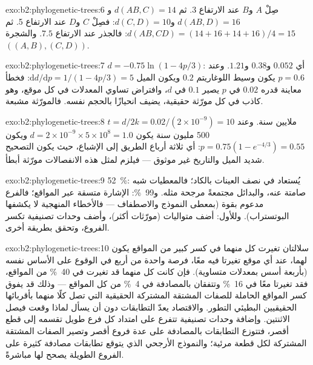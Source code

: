 \begin{solution}{exo:b2:phylogenetic-trees:6}
صِلْ $A$ و$B$ عند الارتفاع 3. ثم $d(AB,C) = 14$ و$d(AB,D) = 16$
و$d(C,D) = 10$: فصِلْ $C$ و$D$ عند الارتفاع 5. ثم $d(AB,CD) = (14 + 16
+ 14 + 16)/4 = 15$: فالجذر عند الارتفاع $7.5$. والشجرة $((A,B),(C,D))$.
\end{solution}

\begin{solution}{exo:b2:phylogenetic-trees:7}
$d = -0.75\ln(1 - 4p/3)$: أي $0.052$ و$0.38$ و$1.21$. وعند $p = 0.6$ يكون
وسيط اللوغاريتم $0.2$ ويكون الميل $\mathrm{d}d/\mathrm{d}p
= 1/(1 - 4p/3) = 5$: فخطأ معاينة قدره $0.02$ في $p$ يصير
$0.1$ في $d$، وافتراض تساوي المعدلات في كل موقع،
وهو كاذب في كل مورّثة حقيقية، يضيف انحيازًا بالحجم نفسه. فالمورّثة
مشبعة.
\end{solution}

\begin{solution}{exo:b2:phylogenetic-trees:8}
$t = d/2k = 0.02/(2\times 10^{-9}) = 10$ ملايين سنة. وعند 500
مليون سنة يكون $d = 2\times 10^{-9}\times 5\times 10^{8} = 1.0$ ويكون
$p = 0.75(1 - e^{-4/3}) = 0.55$: أي ثلاثة أرباع الطريق إلى
الإشباع، حيث يكون التصحيح شديد الميل والتاريخ غير موثوق
--- فيلزم لمثل هذه الانفصالات مورّثة أبطأ.
\end{solution}

\begin{solution}{exo:b2:phylogenetic-trees:9}
\qty{52}{\%}: يُستعاد  في نصف العينات بالكاد؛
فالمعطيات شبه صامتة عنه، والبدائل مجتمعةً
مرجحة مثله. و\qty{99}{\%}: الإشارة متسقة عبر
المواقع؛ فالفرع مدعوم بقوة (بمعطى النموذج
والاصطفاف --- فالأخطاء المنهجية 
لا يكشفها البوتستراب). وللأول: أضف متواليات (مورّثات
أكثر)، وأضف وحدات تصنيفية تكسر الفروع، وتحقق بطريقة أخرى.
\end{solution}

\begin{solution}{exo:b2:phylogenetic-trees:10}
سلالتان تغيرت كل منهما في كسر كبير من المواقع
يكون لهما، عند أي موقع تغيرتا فيه معًا، فرصة واحدة من أربع
في الوقوع على الأساس نفسه (بأربعة أسس بمعدلات متساوية). فإن كانت كل
منهما قد تغيرت في \qty{40}{\%} من المواقع، فقد تغيرتا معًا في
\qty{16}{\%} وتتفقان بالمصادفة في \qty{4}{\%} من كل المواقع ---
وذلك قد يفوق كسر المواقع الحاملة للصفات المشتقة
المشتركة الحقيقية التي تصل كلًا منهما بأقربائها الحقيقيين
البطيئي التطور. والاقتصاد يعدّ التطابقات دون أن يسأل لماذا وقعت
فيصل الاثنتين. وإضافة وحدات تصنيفية تتفرع على امتداد كل فرع
طويل تقسمه إلى قطع أقصر، فتتوزع التطابقات
بالمصادفة على عدة فروع أقصر وتصير الصفات
المشتقة المشتركة لكل قطعة مرئية؛ والنموذج الأرجحي
الذي يتوقع تطابقات مصادفة كثيرة على الفروع الطويلة يصحح
لها مباشرةً.
\end{solution}

